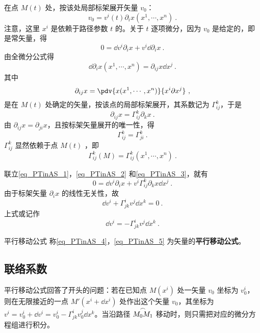 在点 $M(t)$ 处，按该处局部标架展开矢量 $v_0$：
\begin{equation}
v_0=v^i(t)\partial_i x(x^1,\cdots,x^n)~.
\end{equation}
注意，这里 $x^i$ 是依赖于路径参数 $t$ 的。关于 $t$ 逐项微分，因为 $v_0$ 是给定的，即是常矢量，得
\begin{equation}\label{eq_PTinAS_1}
0=\dd v^i\partial_i x+v^i\dd \partial_i x~.
\end{equation}
由全微分公式得
\begin{equation}\label{eq_PTinAS_2}
\dd \partial_i x(x^1,\cdots,x^n)=\partial_{ij}x\dd x^j~.
\end{equation}
其中
\begin{equation}
\partial_{ij}x=\pdv{x(x^1,\cdots,x^n)}{x^i\partial x^j}~,
\end{equation}
是在 $M(t)$ 处确定的矢量，按该点的局部标架展开，其系数记为 $\Gamma^k_{ij}$，于是
\begin{equation}\label{eq_PTinAS_3}
\partial_{ij}x=\Gamma^k_{ij}\partial_k x~.
\end{equation}
由 $\partial_{ij} x=\partial_{ji} x$，且按标架矢量展开的唯一性，得
\begin{equation}
\Gamma^k_{ij}=\Gamma^k_{ji}~.
\end{equation}
 $\Gamma^k_{ij}$ 显然依赖于点 $M(t)$ ，即
 \begin{equation}
 \Gamma^k_{ij}(M)=\Gamma^k_{ij}(x^1,\cdots,x^n)~.
 \end{equation}
 
联立\autoref{eq_PTinAS_1}，\autoref{eq_PTinAS_2} 和\autoref{eq_PTinAS_3}，就有
\begin{equation}
0=\dd v^i\partial_i x+v^i\Gamma^k_{ij}\partial_k x\dd x^j~.
\end{equation}
由于标架矢量 $\partial_i x$ 的线性无关性，故
\begin{equation}\label{eq_PTinAS_4}
\dd v^i+\Gamma^i_{jk}v^j\dd x^k=0~.
\end{equation}
上式或记作
\begin{equation}\label{eq_PTinAS_5}
\dd v^i=-\Gamma^i_{jk}v^j\dd x^k~.
\end{equation}
\begin{definition}{平行移动公式}
称\autoref{eq_PTinAS_4}，\autoref{eq_PTinAS_5} 为矢量的\textbf{平行移动公式}。
\end{definition}

\subsection{联络系数}
平行移动公式回答了开头的问题：若在已知点 $M(x^i)$ 处一矢量 $v_0$ 坐标为 $v_0^i$，则在无限接近的一点 $M'(x^i+\dd x^i)$ 处作出这个矢量 $v_0$，其坐标为 $v^i=v_0^i+\dd v^i=v_0^i-\Gamma^i_{jk}v_0^j\dd x^k$。当沿路径 $\overset{\Huge\frown}{M_0M_1}$ 移动时，则只需把对应的微分方程组进行积分。

